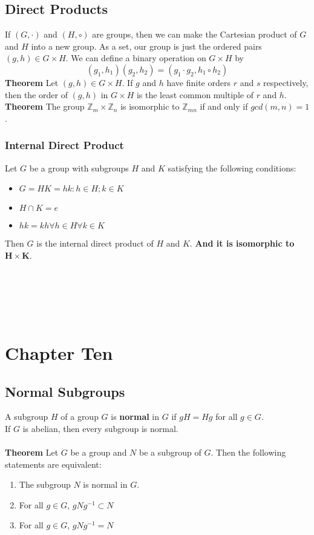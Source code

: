 \documentclass{article}
\begin{document}
\subsection{Direct Products}
If $(G, \cdot)$ and $(H, \circ)$ are groups, then we can make the Cartesian product of $G$ and $H$ into a new group. As a set, our group is just the ordered pairs $(g,h)\in G\times H$. We can define a binary operation on $G\times H$ by
$$(g_1,h_1)(g_2,h_2)=(g_1\cdot g_2, h_1\circ h_2)$$
\textbf{Theorem}
Let $(g,h)\in G\times H$. If $g$ and $h$ have finite orders $r$ and $s$ respectively, then the order of $(g,h)$ in $G\times H$ is the least common multiple of $r$ and $h$.\\
\textbf{Theorem}
The group $\mathbb{Z}_m \times \mathbb{Z}_n$ is isomorphic to $\mathbb{Z}_{mn}$ if and only if $gcd(m,n)=1$.
\subsubsection{Internal Direct Product}
Let $G$ be a group with subgroups $H$ and $K$ satisfying the following conditions:
\begin{itemize}
    \item $G=HK={hk:h\in H; k\in K}$
    \item $H\cap K={e}$
    \item $hk=kh  \forall h\in H  \forall k\in K$
\end{itemize}
Then $G$ is the internal direct product of $H$ and $K$. \textbf{And it is isomorphic to } $\mathbf{H\times K}$.

\\\\\\\\

\section{Chapter Ten}
\subsection{Normal Subgroups}
A subgroup $H$ of a group $G$ is \textbf{normal} in $G$ if $gH=Hg$ for all $g\in G$.\\ If $G$ is abelian, then every subgroup is normal.
\\\\
\textbf{Theorem}
Let $G$ be a group and $N$ be a subgroup of $G$. Then the following statements are equivalent:
\begin{enumerate}
    \item The subgroup $N$ is normal in $G$.
    \item For all $g\in G$, $gNg^{-1}\subset N$
    \item For all $g\in G$, $gNg^{-1}=N$
\end{enumerate}
\end{document}
